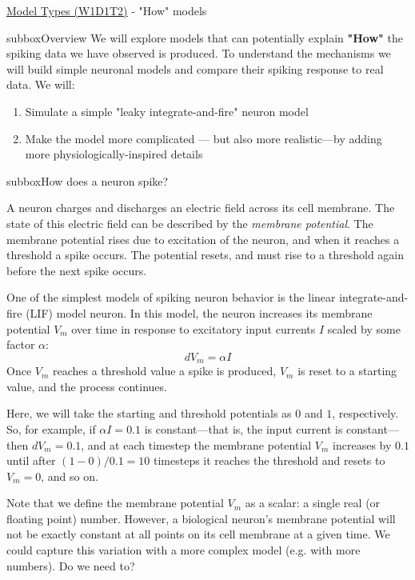\begin{textbox}{\href{https://compneuro.neuromatch.io/tutorials/W1D1_ModelTypes/student/W1D1_Tutorial2.html}{Model Types (W1D1T2)} -  "How" models}
\begin{subbox}{subbox}{Overview }
\scriptsize
We will explore models that can potentially explain \textbf{"How"} the spiking data we have observed is produced. To understand the mechanisms  we will build simple neuronal models and compare their spiking response to real data. We will:
\begin{enumerate}
    \item 
 Simulate a  simple "leaky integrate-and-fire" neuron model 
\item Make the model more complicated — but also more realistic—by adding more physiologically-inspired details
\end{enumerate}
\end{subbox}
\begin{subbox}{subbox}{How does a neuron spike? }
\scriptsize

A neuron charges and discharges an electric field across its cell membrane. The state of this electric field can be described by the \textit{membrane potential}. The membrane potential rises due to excitation of the neuron, and when it reaches a threshold a spike occurs. The potential resets, and must rise to a threshold again before the next spike occurs.

One of the simplest models of spiking neuron behavior is the linear integrate-and-fire (LIF) model neuron. In this model, the neuron increases its membrane potential $V_m$ over time in response to excitatory input currents $I$ scaled by some factor $\alpha$:
\begin{equation}
dV_m = {\alpha}I
\end{equation}
Once $V_m$ reaches a threshold value a spike is produced, $V_m$ is reset to a starting value, and the process continues. 

Here, we will take the starting and threshold potentials as $0$ and $1$, respectively. So, for example, if $\alpha I=0.1$ is constant---that is, the input current is constant---then $dV_m=0.1$, and at each timestep the membrane potential $V_m$ increases by $0.1$ until after $(1-0)/0.1 = 10$ timesteps it reaches the threshold and resets to $V_m=0$, and so on.

Note that we define the membrane potential $V_m$ as a scalar: a single real (or floating point) number. However, a biological neuron's membrane potential will not be exactly constant at all points on its cell membrane at a given time. We could capture this variation with a more complex model (e.g. with more numbers). Do we need to? 


\end{subbox}
\end{textbox}
